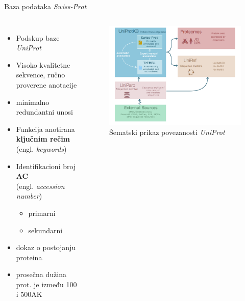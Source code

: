 \documentclass{beamer}
\newcommand{\en}[1]{(engl. \textit{#1})}
\newcommand{\keyword}[1]{\textbf{#1}}
\newcommand{\uniprot}{\textit{UniProt} }
\newcommand{\swissprot}{\textit{Swiss-Prot} }
\begin{document}
\begin{frame}{Baza podataka \swissprot}

  \begin{columns}

    \begin{itemize}
      \small
      \item Podskup baze \uniprot
      \item Visoko kvalitetne sekvence, ručno proverene anotacije 
      \item minimalno redundantni unosi
      \item Funkcija anotirana \keyword{ključnim rečim} \en{keywords}
      \item Identifikacioni broj \keyword{AC} \\ \en{accession number}
        \begin{itemize}
          \item primarni
          \item sekundarni
        \end{itemize}
      \item dokaz o postojanju proteina
      \item prosečna dužina prot. je između 100 i 500AK
    \end{itemize}




\begin{figure}[h!]
  \centering
  \includegraphics[width=1\linewidth]{uniprot_overview.png}
  \caption{Šematski prikaz povezanosti \uniprot}
\end{figure}

  \end{columns}
  
\end{frame}
\end{document}
